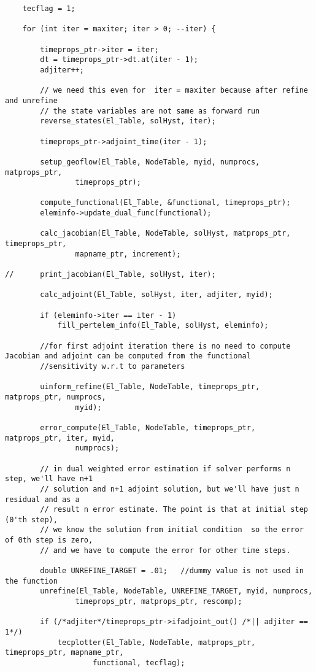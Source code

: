 \documentclass[a4paper,10pt]{article}
\begin{document}
\begin{lstlisting}
	tecflag = 1;

	for (int iter = maxiter; iter > 0; --iter) {

		timeprops_ptr->iter = iter;
		dt = timeprops_ptr->dt.at(iter - 1);
		adjiter++;

		// we need this even for  iter = maxiter because after refine and unrefine
		// the state variables are not same as forward run
		reverse_states(El_Table, solHyst, iter);

		timeprops_ptr->adjoint_time(iter - 1);

		setup_geoflow(El_Table, NodeTable, myid, numprocs, matprops_ptr,
				timeprops_ptr);

		compute_functional(El_Table, &functional, timeprops_ptr);
		eleminfo->update_dual_func(functional);

		calc_jacobian(El_Table, NodeTable, solHyst, matprops_ptr, timeprops_ptr,
				mapname_ptr, increment);

//		print_jacobian(El_Table, solHyst, iter);

		calc_adjoint(El_Table, solHyst, iter, adjiter, myid);

		if (eleminfo->iter == iter - 1)
			fill_pertelem_info(El_Table, solHyst, eleminfo);

		//for first adjoint iteration there is no need to compute Jacobian and adjoint can be computed from the functional
		//sensitivity w.r.t to parameters

		uinform_refine(El_Table, NodeTable, timeprops_ptr, matprops_ptr, numprocs,
				myid);

		error_compute(El_Table, NodeTable, timeprops_ptr, matprops_ptr, iter, myid,
				numprocs);

		// in dual weighted error estimation if solver performs n step, we'll have n+1
		// solution and n+1 adjoint solution, but we'll have just n residual and as a
		// result n error estimate. The point is that at initial step (0'th step),
		// we know the solution from initial condition  so the error of 0th step is zero,
		// and we have to compute the error for other time steps.

		double UNREFINE_TARGET = .01;	//dummy value is not used in the function
		unrefine(El_Table, NodeTable, UNREFINE_TARGET, myid, numprocs,
				timeprops_ptr, matprops_ptr, rescomp);

		if (/*adjiter*/timeprops_ptr->ifadjoint_out() /*|| adjiter == 1*/)
			tecplotter(El_Table, NodeTable, matprops_ptr, timeprops_ptr, mapname_ptr,
					functional, tecflag);


\end{lstlisting}
\end{document}
